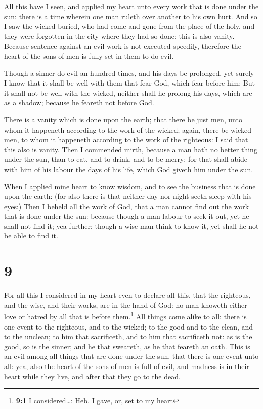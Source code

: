  All this have I seen, and applied my heart unto every
work that is done under the sun: there is a time wherein one man ruleth
over another to his own hurt.  And so I saw the wicked
buried, who had come and gone from the place of the holy, and they were
forgotten in the city where they had so done: this is also vanity.
 Because sentence against an evil work is not executed
speedily, therefore the heart of the sons of men is fully set in them to
do evil.

 Though a sinner do evil an hundred times, and his days
be prolonged, yet surely I know that it shall be well with them that
fear God, which fear before him:  But it shall not be
well with the wicked, neither shall he prolong his days, which are as a
shadow; because he feareth not before God.

 There is a vanity which is done upon the earth; that
there be just men, unto whom it happeneth according to the work of the
wicked; again, there be wicked men, to whom it happeneth according to
the work of the righteous: I said that this also is vanity.
 Then I commended mirth, because a man hath no better
thing under the sun, than to eat, and to drink, and to be merry: for
that shall abide with him of his labour the days of his life, which God
giveth him under the sun.

 When I applied mine heart to know wisdom, and to see the
business that is done upon the earth: (for also there is that neither
day nor night seeth sleep with his eyes:)  Then I beheld
all the work of God, that a man cannot find out the work that is done
under the sun: because though a man labour to seek it out, yet he shall
not find it; yea further; though a wise man think to know it, yet shall
he not be able to find it.

\hypertarget{section-8}{%
\section{9}\label{section-8}}

 For all this I considered in my heart even to declare all
this, that the righteous, and the wise, and their works, are in the hand
of God: no man knoweth either love or hatred by all that is before
them.\footnote{\textbf{9:1} I considered\ldots: Heb. I gave, or, set to
  my heart}  All things come alike to all: there is one
event to the righteous, and to the wicked; to the good and to the clean,
and to the unclean; to him that sacrificeth, and to him that sacrificeth
not: as is the good, so is the sinner; and he that sweareth, as he that
feareth an oath.  This is an evil among all things that
are done under the sun, that there is one event unto all: yea, also the
heart of the sons of men is full of evil, and madness is in their heart
while they live, and after that they go to the dead.

